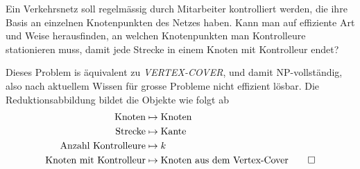 Ein Verkehrsnetz soll regelmässig durch Mitarbeiter
kontrolliert werden, die ihre Basis an einzelnen Knotenpunkten
des Netzes haben.
Kann man auf effiziente Art und Weise herausfinden, an welchen
Knotenpunkten man Kontrolleure stationieren muss, damit jede
Strecke in einem Knoten mit Kontrolleur endet?

\begin{loesung}
Dieses Problem is äquivalent zu \textsl{VERTEX-COVER},
und damit NP-vollständig, also nach aktuellem Wissen für
grosse Probleme nicht effizient lösbar. Die Reduktionsabbildung
bildet die Objekte wie folgt ab
\begin{align*}
\text{Knoten}&\mapsto \text{Knoten}\\
\text{Strecke}&\mapsto \text{Kante}\\
\text{Anzahl Kontrolleure}&\mapsto k\\
\text{Knoten mit Kontrolleur}&\mapsto\text{Knoten aus dem Vertex-Cover}
\qedhere
\end{align*}
\end{loesung}
